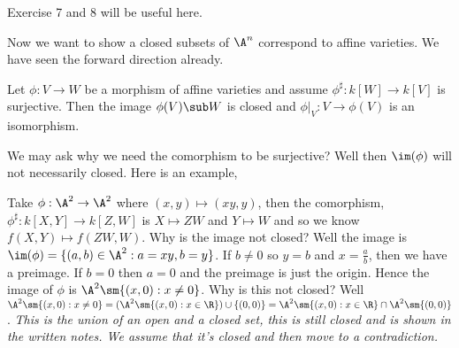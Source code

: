 \begin{eg}
  Exercise 7 and 8 will be useful here.
\end{eg}

\noindent
Now we want to show a closed subsets of $\A^n$ correspond to affine varieties. We have seen the forward direction already.
\begin{nlemma}
  Let $\phi : V \to W$ be a morphism of affine varieties and assume $\phi^\sharp : k[W] \to k[V]$ is surjective. Then the image $\phi(V) \sub W$ is closed and $\phi|_V : V \to \phi(V)$ is an isomorphism.
\end{nlemma}
\begin{remark}
   We may ask why we need the comorphism to be surjective? Well then $\im(\phi)$ will not necessarily closed. Here is an example,
   \begin{eg}
     Take $\phi : \A^2 \to \A^2$ where $(x, y) \mapsto (xy, y)$, then the comorphism, $\phi^\sharp : k[X, Y] \to k[Z, W]$ is $X \mapsto ZW$ and $Y \mapsto W$ and so we know $f(X, Y) \mapsto f(ZW, W)$. Why is the image not closed? Well the image is $\im(\phi) = \{(a, b) \in \A^2 : a = xy, b = y\}$. If $b \ne 0$ so $y = b$
     and $x = \frac{a}{b}$, then we have a preimage. If $b = 0$ then $a= 0$ and the preimage is just the origin. Hence the image of $\phi$ is $\A^2 \sm \{(x, 0) : x \ne 0\}$. Why is this not closed? Well $\A^2 \sm \{(x, 0) : x \ne 0\} = (\A^2 \sm \{(x, 0) : x \in \R\}) \cup \{(0, 0)\} = \A^2 \sm \{(x, 0) : x \in \R\} \cap \A^2 \sm \{(0, 0)\}$.
     \textit{ This is the union of an open and a closed set, this is still closed and is shown in the written notes. We assume that it's closed and then move to a contradiction. }
   \end{eg}
\end{remark}

